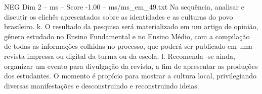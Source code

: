 \begin{textsample}{NEG Dim 2 – ms – Score -1.00 – ms/ms\_em\_49.txt}
Na sequência, analisar e discutir os clichês apresentados sobre as identidades e as culturas do povo brasileiro. k.
O resultado da pesquisa será materializado em um artigo de opinião, gênero estudado no Ensino Fundamental e no Ensino Médio, com a compilação de todas as informações colhidas no processo, que poderá ser publicado em uma revista impressa ou digital da turma ou da escola. l.
Recomenda -se ainda, organizar um evento para divulgação da revista, a fim de apresentar as produções dos estudantes.
O momento é propício para mostrar a cultura local, privilegiando diversas manifestações e desconstruindo e reconstruindo ideias.

\end{textsample}
